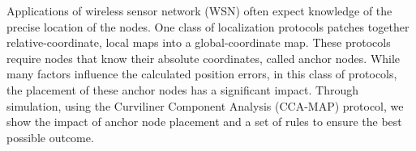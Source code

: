Applications of wireless sensor network (WSN) often expect knowledge of the precise location of the nodes. One class of localization protocols patches together relative-coordinate, local maps into a global-coordinate map.  These protocols require nodes that know their absolute coordinates, called anchor nodes.  While many factors influence the calculated position errors, in this class of protocols, the placement of these anchor nodes has a significant impact.  Through simulation, using the Curviliner Component Analysis (CCA-MAP) protocol, we show the impact of anchor node placement and a set of rules to ensure the best possible outcome.
